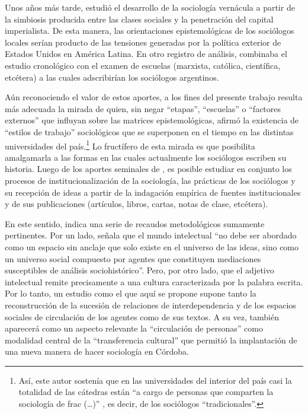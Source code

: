 Unos años más tarde, \textcite{1450-VERON1974} estudió el desarrollo de la sociología vernácula a partir de la simbiosis producida entre las clases sociales y la penetración del capital imperialista. De esta manera, las orientaciones epistemológicas de los sociólogos locales serían producto de las tensiones generadas por la política exterior de Estados Unidos en América Latina. En otro registro de análisis, \textcite{1703-MARSAL1963} combinaba el estudio cronológico con el examen de escuelas (marxista, católica, científica, etcétera) a las cuales adscribirían los sociólogos argentinos.

Aún reconociendo el valor de estos aportes, a los fines del presente trabajo resulta más adecuada la mirada de \textcite{1613-DELICH1977} quien, sin negar \enquote{etapas}, \enquote{escuelas} o \enquote{factores externos} que influyan sobre las matrices epistemológicas, afirmó la existencia de \enquote{estilos de trabajo} sociológicos que se superponen en el tiempo en las distintas universidades del país.\footnote{Así, este autor sostenía que en las universidades del interior del país casi la totalidad de las cátedras están \enquote{a cargo de personas que comparten la sociología de frac (\dots)} \parencite[34]{1613-DELICH1977}, es decir, de los sociólogos \enquote{tradicionales}.} Lo fructífero de esta mirada es que posibilita amalgamarla a las formas en las cuales actualmente los sociólogos escriben su historia. Luego de los aportes seminales de \textcite{1565-BLANCO2006,1668-PEREYRA2005,1670-GONZALEZBOLLO1999}, es posible estudiar en conjunto los procesos de institucionalización de la sociología, las prácticas de los sociólogos y su recepción de ideas a partir de la indagación empírica de fuentes institucionales y de sus publicaciones (artículos, libros, cartas, notas de clase, etcétera).

En este sentido, \textcite[31]{1510-SAPIRO2017} indica una serie de recaudos metodológicos sumamente pertinentes. Por un lado, señala que el mundo intelectual \enquote{no debe ser abordado como un espacio sin anclaje que solo existe en el universo de las ideas, sino como un universo social compuesto por agentes  que constituyen mediaciones susceptibles de análisis sociohistórico}. Pero, por otro lado, que el adjetivo intelectual remite precisamente a una cultura caracterizada por la palabra escrita. Por lo tanto, un estudio como el que aquí se propone supone tanto la reconstrucción de la sucesión de relaciones de interdependencia y de los espacios sociales de circulación de los agentes como de sus textos. A su vez, también aparecerá como un aspecto relevante la \enquote{circulación de personas} \parencite[35]{1510-SAPIRO2017} como modalidad central de la \enquote{transferencia cultural} que permitió la implantación de una nueva manera de hacer sociología en Córdoba.

